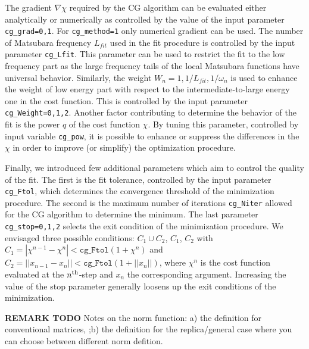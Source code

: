 \documentclass[edipack2.tex]{subfiles}
\begin{document}
The gradient $\nabla\chi$ required by the CG algorithm can be
evaluated either analytically or numerically as
controlled by the value of the input parameter \texttt{cg\_grad=0,1}. For
\texttt{cg\_method=1} only numerical gradient can be used.
The number of Matsubara frequency $L_{fit}$ used in the fit procedure
is controlled  by the input parameter \texttt{cg\_Lfit}.
This parameter can be used to restrict the fit to the low frequency
part as the large frequency tails of the local Matsubara functions
have universal behavior.
Similarly, the weight  $W_n=1,1/L_{fit},1/\omega_n$ is used to
enhance the weight of low energy part with respect to the
intermediate-to-large energy one in the cost function.
This is controlled by the input parameter \texttt{cg\_Weight=0,1,2}.
Another  factor contributing to determine the behavior
of the fit is the power $q$ of the cost function $\chi$. By tuning
this parameter, controlled by input variable \texttt{cg\_pow}, it is
possible to enhance or suppress the differences in the $\chi$ in order
to improve (or simplify) the optimization procedure.  

Finally, we introduced few additional parameters which aim to
control the quality of the fit. The first is the fit tolerance,
controlled by the input parameter \texttt{cg\_Ftol}, which
determines the convergence threshold of the minimization procedure.
The second is the maximum number of iterations \texttt{cg\_Niter}
allowed for the CG algorithm to determine the minimum.
The last parameter \texttt{cg\_stop=0,1,2} selects the exit
condition of the minimization procedure. We envisaged  three
possible conditions: $C_1\cup C_2$, $C_1$, $C_2$ with 
$C_1=|\chi^{n-1} -\chi^n|<\mathtt{cg\_Ftol}(1+\chi^n)$ and
$C_2=||x_{n-1} -x_n||<\mathtt{cg\_Ftol}(1+||x_n||)$, where $\chi^n$
is the cost function evaluated at the $n^{\rm th}$-step and $x_n$
the corresponding argument. Increasing the value of the stop
parameter generally loosens up the exit conditions of the minimization.   

{\bf REMARK TODO}
Notes on the norm function: a) the definition for conventional
matrices, ;b) the definition for the replica/general case where you
can choose between different norm defition.
\end{document}
